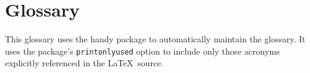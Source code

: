 
\chapter{Glossary}

This glossary uses the handy  package to automatically
maintain the glossary.  It uses the package's \texttt{printonlyused}
option to include only those acronyms explicitly referenced in the
\LaTeX\ source.


